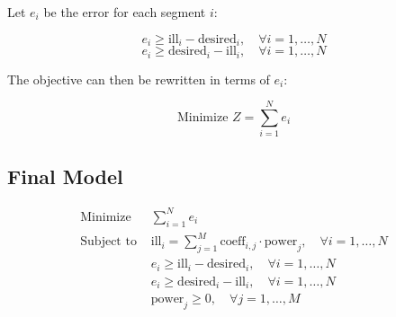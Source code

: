 \documentclass{article}
\begin{document}
Let \( e_i \) be the error for each segment \( i \):

\[
e_i \geq \text{ill}_i - \text{desired}_i, \quad \forall i = 1, \ldots, N
\]
\[
e_i \geq \text{desired}_i - \text{ill}_i, \quad \forall i = 1, \ldots, N
\]

The objective can then be rewritten in terms of \( e_i \):

\[
\text{Minimize } Z = \sum_{i=1}^{N} e_i
\]

\subsection*{Final Model}
\begin{align*}
\text{Minimize } & \sum_{i=1}^{N} e_i \\
\text{Subject to } & \text{ill}_i = \sum_{j=1}^{M} \text{coeff}_{i,j} \cdot \text{power}_j, \quad \forall i = 1, \ldots, N \\
& e_i \geq \text{ill}_i - \text{desired}_i, \quad \forall i = 1, \ldots, N \\
& e_i \geq \text{desired}_i - \text{ill}_i, \quad \forall i = 1, \ldots, N \\
& \text{power}_j \geq 0, \quad \forall j = 1, \ldots, M
\end{align*}
\end{document}
